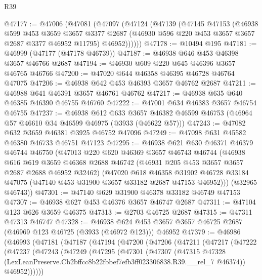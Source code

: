 \begin{lexlean}{R39}
\begin{coremodule}
@47177 := @47006
    (@47081
      (@47097
        (@47124
          (@47139
            (@47145
              @47153
              (@46938
                @599
                @453
                @3659
                @3657
                @3377
                @2687
                (@46930 @596 @220 @453 @3657 @3657 @2687 @3377 @46952 @11795)
                @46952))))))
@47178 := @10494 @195
@47181 := @46999 (@47177 (@47178 @46739))
@47187 := @46938 @646 @453 @46398 @3657 @46766 @2687
@47194 := @46930 @609 @220 @645 @46396 @3657 @46765 @46766
@47200 := @47020 @644 @46358 @46395 @46728 @46764 @47075
@47206 := @46938 @642 @453 @46393 @3657 @46762 @2687
@47211 := @46988 @641 @46391 @3657 @46761 @46762
@47217 := @46938 @635 @640 @46385 @46390 @46755 @46760
@47222 := @47001 @634 @46383 @3657 @46754 @46755
@47237 := @46938
    @612
    @633
    @3657
    @46382
    @46599
    @46753
    (@46964 @57 @46610 @34 @46599 @46975 (@3933 (@46622 @57)))
@47243 := @47082 @632 @3659 @46381 @3925 @46752 @47096
@47249 := @47098 @631 @45582 @46380 @46733 @46751 @47123
@47295 := @46938
    @621
    @630
    @46371
    @46379
    @46744
    @46750
    (@47013
      @220
      @620
      @46369
      @3657
      @46743
      @46744
      (@46938
        @616
        @619
        @3659
        @46368
        @2688
        @46742
        (@46931 @205 @453 @3657 @3657 @2687 @2688 @46952 @32462)
        (@47020
          @618
          @46358
          @31902
          @46728
          @33184
          @47075
          (@47140 @453 @31900 @3657 @33182 @2687 @47153 @46952)))
      (@32965 @46743))
@47301 := @47140 @629 @31900 @46378 @33182 @46749 @47153
@47307 := @46938 @627 @453 @46376 @3657 @46747 @2687
@47311 := @47104 @123 @626 @3659 @46375
@47313 := @2703 @46725 @2687
@47315 := @47311 @47313 @46747
@47328 := @46938
    @624
    @453
    @3657
    @3657
    @46725
    @2687
    (@46969 @123 @46725 (@3933 (@46972 @123)))
    @46952
@47379 := @46986
    (@46993
      (@47181
        (@47187
          (@47194
            (@47200
              (@47206
                (@47211
                  (@47217
                    (@47222
                      (@47237
                        (@47243
                          (@47249
                            (@47295
                              (@47301
                                (@47307
                                  (@47315
                                    @47328
                                    (LexLeanPreserve.Cb2bffcc8b22fbbef7efb3ff023306838.R39.__rel_7
                                      @46374))
                                  @46952))))))

\end{coremodule}
\end{lexlean}
